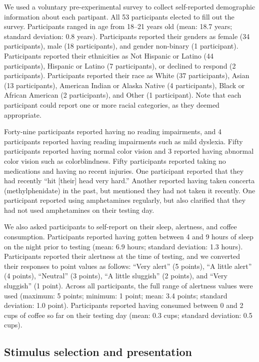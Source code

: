 \documentclass[english]{article}
\begin{document}
We used a voluntary pre-experimental survey to collect self-reported
demographic information about each partipant. All 53 participants elected to
fill out the survey. Participants ranged in age from 18--21 years old (mean:
18.7 years; standard deviation: 0.8 years). Participants reported their genders
as female (34 participants), male (18 participants), and gender non-binary (1
participant). Participants reported their ethnicities as Not Hispanic or Latino
(44 participants), Hispanic or Latino (7 participants), or declined to respond
(2 participants). Participants reported their race as White (37 participants),
Asian (13 participants), American Indian or Alaska Native (4 participants),
Black or African American (2 participants), and Other (1 participant). Note
that each participant could report one or more racial categories, as they
deemed appropriate. 

Forty-nine participants reported having no reading impairments, and 4
participants reported having reading impairments such as mild dyslexia. Fifty
participants reported having normal color vision and 3 reported having abnormal
color vision such as colorblindness. Fifty participants reported taking no
medications and having no recent injuries. One participant reported that they
had recently ``hit [their] head very hard.'' Another reported having taken
concerta (methylphenidate) in the past, but mentioned they had not taken it
recently. One participant reported using amphetamines regularly, but also
clarified that they had not used amphetamines on their testing day.

We also asked participants to self-report on their sleep, alertness, and coffee
consumption. Participants reported having gotten between 4 and 9 hours of sleep
on the night prior to testing (mean: 6.9 hours; standard deviation: 1.3 hours).
Participants reported their alertness at the time of testing, and we converted
their responses to point values as follows: ``Very alert'' (5 points), ``A
little alert'' (4 points), ``Neutral'' (3 points), ``A little sluggish'' (2
points), and ``Very sluggish'' (1 point). Across all participants, the full
range of alertness values were used (maximum: 5 points; minimum: 1 point; mean:
3.4 points; standard deviation: 1.0 point). Participants reported having
consumed between 0 and 2 cups of coffee so far on their testing day (mean: 0.3
cups; standard deviation: 0.5 cups).

\subsection*{Stimulus selection and presentation} 
\end{document}
